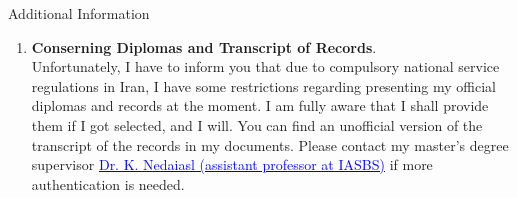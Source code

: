 \begin{cSection}{Additional Information}
	\begin{enumerate}[*]
		\item \textbf{Conserning Diplomas and Transcript of Records}.\\ Unfortunately, I have to inform you that due to compulsory national service regulations in Iran, I have some restrictions regarding presenting my official diplomas and records at the moment. I am fully aware that I shall provide them if I got selected, and I will. You can find an unofficial version of the transcript of the records in my documents. Please contact my master's degree supervisor \href{https://iasbs.ac.ir/personalpage?id=31016&staff=0}{\textcolor{blue}{Dr. K. Nedaiasl (assistant professor at IASBS)}} if more authentication is needed.
	\end{enumerate}
\end{cSection}
